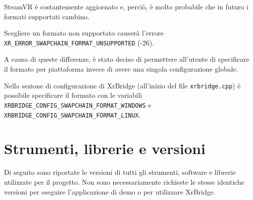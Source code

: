 \documentclass[twoside]{supsistudent}
\begin{document}
SteamVR è costantemente aggiornato e, perciò, è molto probabile che in futuro i formati supportati cambino.

Scegliere un formato non supportato causerà l'errore \texttt{XR\_ERROR\_SWAPCHAIN\_FORMAT\_UNSUPPORTED} (-26).

A causa di queste differenze, è stato deciso di permettere all'utente di specificare il formato per piattaforma invece di avere una singola configurazione globale.

Nella sezione di configurazione di XrBridge (all'inizio del file \texttt{xrbridge.cpp}) è possibile specificare il formato con le variabili \texttt{XRBRIDGE\_CONFIG\_SWAPCHAIN\_FORMAT\_WINDOWS} e \texttt{XRBRIDGE\_CONFIG\_SWAPCHAIN\_FORMAT\_LINUX}.

\section{Strumenti, librerie e versioni}

Di seguito sono riportate le versioni di tutti gli strumenti, software e librerie utilizzate per il progetto. Non sono necessariamente richieste le stesse identiche versioni per eseguire l'applicazione di demo o per utilizzare XrBridge.
\end{document}
